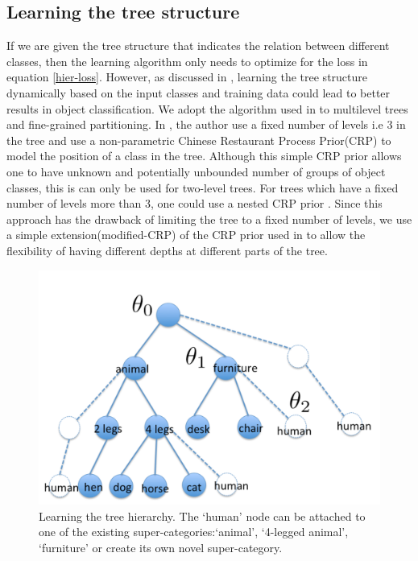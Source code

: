 \documentclass[10pt,twocolumn,letterpaper]{article}
\begin{document}
\subsection{Learning the tree structure}
 
If we are given the tree structure that indicates the relation between different classes, then the 
learning algorithm only needs to optimize for the loss in equation \ref{hier-loss}. However, as 
discussed in \cite{ruslan}, learning the tree structure dynamically based on the input classes and training data
could lead to better results in object classification. We adopt the algorithm used in \cite{ruslan} to multilevel trees
and fine-grained partitioning. In \cite{ruslan}, the author use a fixed number of levels i.e 3 in the tree and use
a non-parametric Chinese Restaurant Process Prior(CRP) to model the position of a class in the tree. Although this simple
CRP prior allows one to have unknown and potentially unbounded number of groups of object classes, this is can only be
used for two-level trees. For trees which have a fixed number of levels more than 3, one could use a nested CRP prior \cite{nestedCRP}.
Since this approach has the drawback of limiting the tree to a fixed number of levels, we use a simple extension(modified-CRP) of the
CRP prior used in \cite{ruslan} to allow the flexibility of  having different depths at different parts of the tree.    

\begin{figure}[t]
	\begin{center}
		\includegraphics[width=0.8\linewidth]{tree}
	\end{center}
	\caption{ Learning the tree hierarchy. The `human' node can be attached 
              to one of the existing super-categories:`animal', `4-legged animal', `furniture'
              or create its own novel super-category.}
	\label{fig:learning-tree-hierarchy}
\end{figure}
\end{document}
